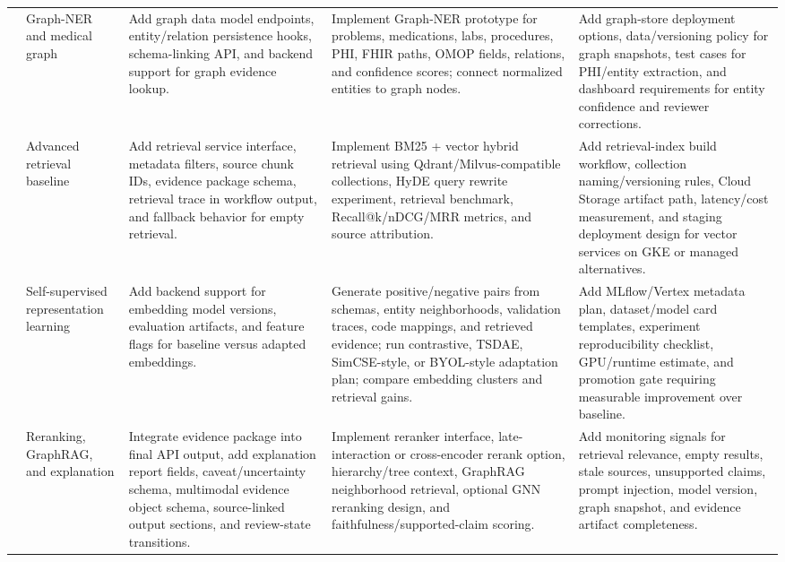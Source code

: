 {\begin{longtable}{p{}p{}p{}p{}p{}}
\addlinespace
5 & Graph-NER and medical graph & Add graph data model endpoints, entity/relation persistence hooks, schema-linking API, and backend support for graph evidence lookup. & Implement Graph-NER prototype for problems, medications, labs, procedures, PHI, FHIR paths, OMOP fields, relations, and confidence scores; connect normalized entities to graph nodes. & Add graph-store deployment options, data/versioning policy for graph snapshots, test cases for PHI/entity extraction, and dashboard requirements for entity confidence and reviewer corrections. \\
\addlinespace
6 & Advanced retrieval baseline & Add retrieval service interface, metadata filters, source chunk IDs, evidence package schema, retrieval trace in workflow output, and fallback behavior for empty retrieval. & Implement BM25 + vector hybrid retrieval using Qdrant/Milvus-compatible collections, HyDE query rewrite experiment, retrieval benchmark, Recall@k/nDCG/MRR metrics, and source attribution. & Add retrieval-index build workflow, collection naming/versioning rules, Cloud Storage artifact path, latency/cost measurement, and staging deployment design for vector services on GKE or managed alternatives. \\
\addlinespace
7 & Self-supervised representation learning & Add backend support for embedding model versions, evaluation artifacts, and feature flags for baseline versus adapted embeddings. & Generate positive/negative pairs from schemas, entity neighborhoods, validation traces, code mappings, and retrieved evidence; run contrastive, TSDAE, SimCSE-style, or BYOL-style adaptation plan; compare embedding clusters and retrieval gains. & Add MLflow/Vertex metadata plan, dataset/model card templates, experiment reproducibility checklist, GPU/runtime estimate, and promotion gate requiring measurable improvement over baseline. \\
\addlinespace
8 & Reranking, GraphRAG, and explanation & Integrate evidence package into final API output, add explanation report fields, caveat/uncertainty schema, multimodal evidence object schema, source-linked output sections, and review-state transitions. & Implement reranker interface, late-interaction or cross-encoder rerank option, hierarchy/tree context, GraphRAG neighborhood retrieval, optional GNN reranking design, and faithfulness/supported-claim scoring. & Add monitoring signals for retrieval relevance, empty results, stale sources, unsupported claims, prompt injection, model version, graph snapshot, and evidence artifact completeness. \\

\end{longtable}}
